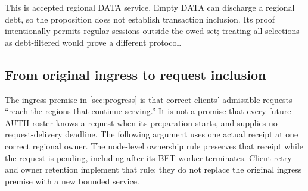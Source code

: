 This is accepted regional DATA service. Empty DATA can discharge a
regional debt, so the proposition does not establish transaction
inclusion. Its proof intentionally permits regular sessions outside
the owed set; treating all selections as debt-filtered would prove a
different protocol.

\subsection{From original ingress to request inclusion}
\label{sec:v35-request-limit}
The ingress premise in \cref{sec:progress} is that correct clients'
admissible requests ``reach the regions that continue serving.'' It is
not a promise that every future AUTH roster knows a request when its
preparation starts, and supplies no request-delivery deadline. The
following argument uses one actual receipt at one correct regional
owner. The node-level ownership rule preserves that receipt while the
request is pending, including after its BFT worker terminates. Client
retry and owner retention implement that rule; they do not replace the
original ingress premise with a new bounded service.

